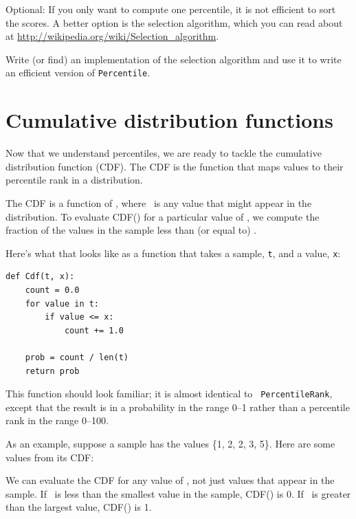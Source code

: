 \documentclass[12pt]{book}
\begin{document}
\begin{exercise}
Optional: If you only want to compute one percentile, it is not
efficient to sort the scores.  A better option is the selection
algorithm, which you can read about at
\url{http://wikipedia.org/wiki/Selection_algorithm}.

Write (or find) an implementation of the selection algorithm and use
it to write an efficient version of {\tt Percentile}.

\end{exercise}


\section{Cumulative distribution functions}

Now that we understand percentiles, we are ready to tackle the
cumulative distribution function (CDF).  The CDF is the function that
maps values to their percentile rank in a distribution.

The CDF is a function of \x, where \x~is any value that might appear
in the distribution.  To evaluate CDF(\x) for a particular value of
\x, we compute the fraction of the values in the sample less than (or
equal to) \x.

Here's what that looks like as a function that takes a sample,
{\tt t}, and a value, {\tt x}:
%
\begin{verbatim}
def Cdf(t, x):
    count = 0.0
    for value in t:
        if value <= x:
            count += 1.0

    prob = count / len(t)
    return prob
\end{verbatim}

This function should look familiar; it is almost identical to {\tt
  PercentileRank}, except that the result is in a probability in the
range 0--1 rather than a percentile rank in the range 0--100.

As an example, suppose a sample has the values \{1, 2, 2, 3, 5\}.
Here are some values from its CDF:







We can evaluate the CDF for any value of \x, not just
values that appear in the sample.
If \x~is less than the smallest value in the sample, CDF(\x) is 0.
If \x~is greater than the largest value, CDF(\x) is 1.
\end{document}
